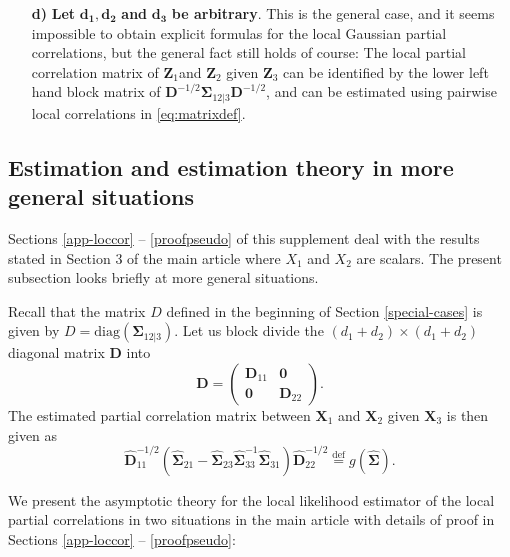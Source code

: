 \documentclass[
  12pt,
  letterpaper]{article}
\numberwithin{equation}{section}
\newcommand{\X}{\bm{X}}
\newcommand{\Z}{\bm{Z}}
\newcommand{\D}{\bm{D}}
\newcommand{\hD}{\widehat{\bm{D}}}
\newcommand{\fSigma}{\bm{\Sigma}}
\newcommand{\hfSigma}{\widehat{\bm{\Sigma}}}
\begin{document}
\begin{itemize}
\item[\textbf{d)}] \textbf{Let} $\bm{d_1, d_2}$ \textbf{and} $\bm{d_3}$ \textbf{be arbitrary}. This is the general case, and it seems impossible to obtain explicit formulas for the local Gaussian partial correlations, but the general fact still holds of course: The local partial correlation matrix of $\Z_1$and $\Z_2$ given $\Z_3$ can be identified by the lower left hand block matrix of $\D^{-1/2}\fSigma_{12|3}\D^{-1/2}$, and can be estimated using pairwise local correlations in \eqref{eq:matrixdef}.
\end{itemize}

\hypertarget{chap:estimation}{%
\subsection{Estimation and estimation theory in more general situations}\label{chap:estimation}}

Sections \ref{app-loccor} -- \ref{proofpseudo} of this supplement deal with the results stated in Section 3 of the main article where \(X_1\) and \(X_2\) are scalars. The present subsection looks briefly at more general situations.

Recall that the matrix \(D\) defined in the beginning of Section \ref{special-cases} is given by \(D = \textrm{diag}(\fSigma_{12|3})\). Let us block divide the \((d_1+d_2)\times (d_1+d_2)\) diagonal matrix \(\D\) into
\[\D = \begin{pmatrix} \D_{11} & \bm{0} \\ \bm{0} & \D_{22}\end{pmatrix}.\]
The estimated partial correlation matrix between \(\X_1\) and \(\X_2\) given \(\X_3\) is then given as
\begin{equation}
\hD_{11}^{-1/2}\left(\hfSigma_{21} - \hfSigma_{23}\hfSigma_{33}^{-1}\hfSigma_{31}\right)\hD_{22}^{-1/2} \stackrel{\textrm{def}}{=} g(\hfSigma).
\label{eq:lgpc-matrix}
\end{equation}

We present the asymptotic theory for the local likelihood estimator of the local partial correlations in two situations in the main article with details of proof in Sections \ref{app-loccor} -- \ref{proofpseudo}:
\end{document}

